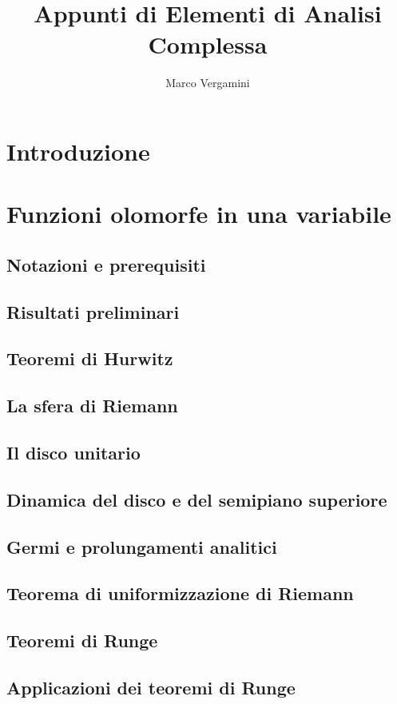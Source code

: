 \documentclass{article}
\title{Appunti di Elementi di Analisi Complessa}
\date{}
\author{Marco Vergamini}
\begin{document}
\maketitle
\newpage
\tableofcontents
\newpage


\section{Introduzione}


\newpage

\section{Funzioni olomorfe in una variabile}

\subsection{Notazioni e prerequisiti}


\subsection{Risultati preliminari}


\subsection{Teoremi di Hurwitz}


\subsection{La sfera di Riemann}


\subsection{Il disco unitario}


\subsection{Dinamica del disco e del semipiano superiore}


\subsection{Germi e prolungamenti analitici}


\subsection{Teorema di uniformizzazione di Riemann}


\subsection{Teoremi di Runge}


\subsection{Applicazioni dei teoremi di Runge}

\end{document}
